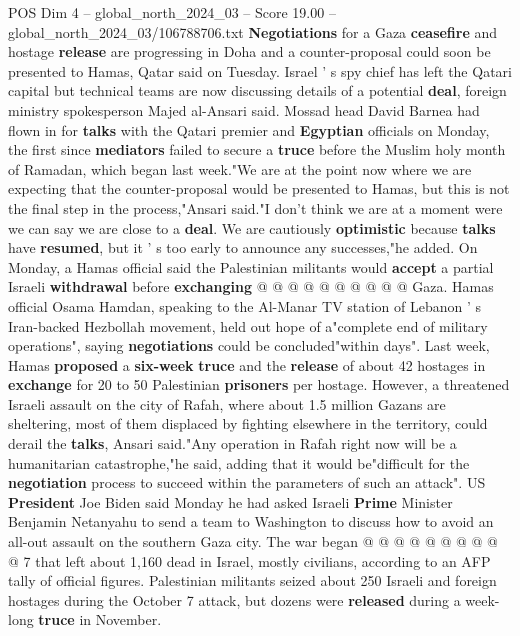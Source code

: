 \begin{textsample}{POS Dim 4 – global\_north\_2024\_03 – Score 19.00 – global\_north\_2024\_03/106788706.txt}  \label{ex:f4_pos_239}
\textbf{Negotiations} for a Gaza \textbf{ceasefire} and hostage \textbf{release} are progressing in Doha and a counter-proposal could soon be presented to Hamas, Qatar said on Tuesday.
Israel ' s spy chief has left the Qatari capital but technical teams are now discussing details of a potential \textbf{deal}, foreign ministry spokesperson Majed al-Ansari said.
Mossad head David Barnea had flown in for \textbf{talks} with the Qatari premier and \textbf{Egyptian} officials on Monday, the first since \textbf{mediators} failed to secure a \textbf{truce} before the Muslim holy month of Ramadan, which began last week."We are at the point now where we are expecting that the counter-proposal would be presented to Hamas, but this is not the final step in the process,"Ansari said."I don't think we are at a moment were we can say we are close to a \textbf{deal}.
We are cautiously \textbf{optimistic} because \textbf{talks} have \textbf{resumed}, but it ' s too early to announce any successes,"he added.
On Monday, a Hamas official said the Palestinian militants would \textbf{accept} a partial Israeli \textbf{withdrawal} before \textbf{exchanging} @ @ @ @ @ @ @ @ @ @ Gaza.
Hamas official Osama Hamdan, speaking to the Al-Manar TV station of Lebanon ' s Iran-backed Hezbollah movement, held out hope of a"complete end of military operations", saying \textbf{negotiations} could be concluded"within days".
Last week, Hamas \textbf{proposed} a \textbf{six-week} \textbf{truce} and the \textbf{release} of about 42 hostages in \textbf{exchange} for 20 to 50 Palestinian \textbf{prisoners} per hostage.
However, a threatened Israeli assault on the city of Rafah, where about 1.5 million Gazans are sheltering, most of them displaced by fighting elsewhere in the territory, could derail the \textbf{talks}, Ansari said."Any operation in Rafah right now will be a humanitarian catastrophe,"he said, adding that it would be"difficult for the \textbf{negotiation} process to succeed within the parameters of such an attack".
US \textbf{President} Joe Biden said Monday he had asked Israeli \textbf{Prime} Minister Benjamin Netanyahu to send a team to Washington to discuss how to avoid an all-out assault on the southern Gaza city.
The war began @ @ @ @ @ @ @ @ @ @ 7 that left about 1,160 dead in Israel, mostly civilians, according to an AFP tally of official figures.
Palestinian militants seized about 250 Israeli and foreign hostages during the October 7 attack, but dozens were \textbf{released} during a week-long \textbf{truce} in November.

\end{textsample}
